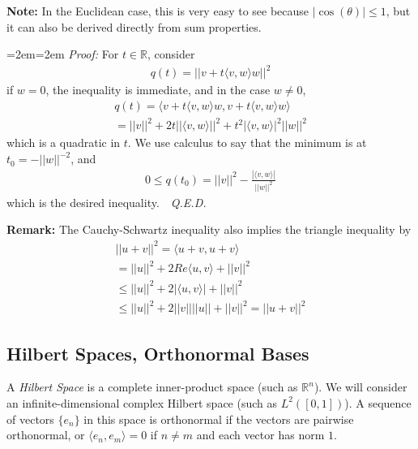 \documentclass{article}
\newcommand{\R}{{\mathbb{R}}}
\newcommand{ \norm }[1]{{ || {#1}||}}
\newenvironment{pf}{%
	\par%
	\medskip
	\leftskip=2em\rightskip=2em%
	\noindent\ignorespaces \textit{Proof:} \newline}{%
	\,\, \newline \textit{Q.E.D.}\par\medskip}
\begin{document}
	
	\textbf{Note:} In the Euclidean case, this is very easy to see because $|\cos(\theta)| \leq 1$, but it can also be derived directly from sum properties.
	
	\begin{pf}
		For $t \in \R$, consider 
		\begin{align*}
			q(t) = \norm{v+t\langle v,w\rangle w}^{2}
		\end{align*}
		if $w=0$, the inequality is immediate, and in the case $w \neq 0$, 
		\begin{align*}
			q(t) = \langle v+t\langle v,w\rangle w,v+t\langle v,w\rangle w\rangle  \\
			= \norm{v}^{2} + 2t \norm{\langle v,w\rangle }^{2} + t^{2} |\langle v,w\rangle |^{2} \norm{w}^{2}
		\end{align*}
		which is a quadratic in $t$. We use calculus to say that the minimum is at $t_{0} = - \norm{w}^{-2}$, and 
		\begin{align*}
			0 \leq q(t_0) = \norm{v}^{2} - \frac{|\langle v,w\rangle |}{\norm{w}^{2}} 
		\end{align*}
		which is the desired inequality. 
	\end{pf}
	
	\vspace{0.25 cm}
	
	\textbf{Remark:} The Cauchy-Schwartz inequality also implies the triangle inequality by 
	\begin{align*}
		\norm{u+v}^{2} = \langle u+v,u+v\rangle \\
		= \norm{u}^{2} + 2 Re\langle u,v\rangle +\norm{v}^{2} \\
		\leq \norm{u}^{2} + 2|\langle u,v\rangle|+\norm{v}^{2} \\
		\leq \norm{u}^{2} + 2 \norm{v}\norm{u} +\norm{v}^{2} = \norm{u+v}^{2}
	\end{align*}
	
	
	
	
	\subsection{Hilbert Spaces, Orthonormal Bases}
	
	A \textit{Hilbert Space} is a complete inner-product space (such as $\R^{n}$). We will consider an infinite-dimensional complex Hilbert space (such as $L^{2}([0,1])$). A sequence of vectors $\{e_{n}\}$ in this space is orthonormal if the vectors are pairwise orthonormal, or $\langle e_n, e_m \rangle  = 0$ if $n \neq m$ and each vector has norm $1$. 
	
\end{document}
